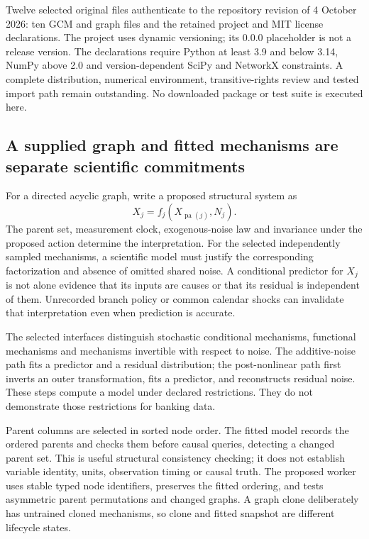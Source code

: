 Twelve selected original files authenticate to the repository revision of
4 October 2026: ten GCM and graph files and the retained project and MIT
license declarations. The project uses dynamic versioning; its 0.0.0
placeholder is not a release version. The declarations require Python
at least 3.9 and below 3.14, NumPy above 2.0 and version-dependent SciPy
and NetworkX constraints. A complete distribution, numerical environment,
transitive-rights review and tested import path remain outstanding.
No downloaded package or test suite is executed here.
\citep{exec24_gcm_source}

\subsection{A supplied graph and fitted mechanisms are separate scientific commitments}
For a directed acyclic graph, write a proposed structural system as
\[
 X_j=f_j(X_{\operatorname{pa}(j)},N_j).
\]
The parent set, measurement clock, exogenous-noise law and invariance
under the proposed action determine the interpretation. For the selected
independently sampled mechanisms, a scientific model must justify the
corresponding factorization and absence of omitted shared noise. A conditional
predictor for $X_j$ is not alone evidence that its inputs are causes or
that its residual is independent of them. Unrecorded branch policy or
common calendar shocks can invalidate that interpretation even when
prediction is accurate.~\citep{exec24_gcm_choice}

The selected interfaces distinguish stochastic conditional mechanisms,
functional mechanisms and mechanisms invertible with respect to noise.
The additive-noise path fits a predictor and a residual distribution;
the post-nonlinear path first inverts an outer transformation, fits a
predictor, and reconstructs residual noise. These steps compute a model
under declared restrictions. They do not demonstrate those restrictions
for banking data.~\citep{exec24_gcm_source}

Parent columns are selected in sorted node order. The fitted model records
the ordered parents and checks them before causal queries, detecting a
changed parent set. This is useful structural consistency checking; it
does not establish variable identity, units, observation timing or causal
truth. The proposed worker uses stable typed node identifiers, preserves
the fitted ordering, and tests asymmetric parent permutations and changed
graphs. A graph clone deliberately has untrained cloned mechanisms, so
clone and fitted snapshot are different lifecycle states.
\citep{exec24_gcm_source,exec24_gcm_choice}

